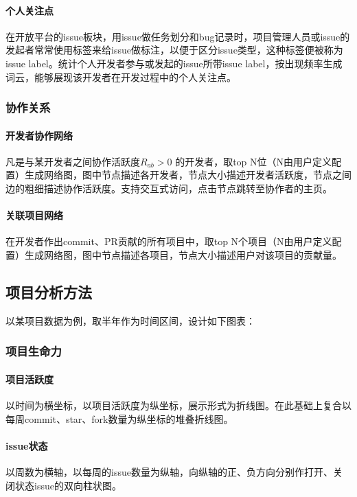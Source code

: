 \paragraph{个人关注点} 在开放平台的issue板块，用issue做任务划分和bug记录时，项目管理人员或issue的发起者常常使用标签来给issue做标注，以便于区分issue类型，这种标签便被称为issue label。统计个人开发者参与或发起的issue所带issue label，按出现频率生成词云，能够展现该开发者在开发过程中的个人关注点。

\subsubsection{协作关系}
\paragraph{开发者协作网络} 凡是与某开发者之间协作活跃度$R_{ab} > 0$ 的开发者，取top N位（N由用户定义配置）生成网络图，图中节点描述各开发者，节点大小描述开发者活跃度，节点之间边的粗细描述协作活跃度。支持交互式访问，点击节点跳转至协作者的主页。

\paragraph{关联项目网络} 在开发者作出commit、PR贡献的所有项目中，取top N个项目（N由用户定义配置）生成网络图，图中节点描述各项目，节点大小描述用户对该项目的贡献量。

\subsection{项目分析方法}
\par 以某项目数据为例，取半年作为时间区间，设计如下图表：
\subsubsection{项目生命力}
\paragraph{项目活跃度} 以时间为横坐标，以项目活跃度为纵坐标，展示形式为折线图。在此基础上复合以每周commit、star、fork数量为纵坐标的堆叠折线图。
\paragraph{issue状态} 以周数为横轴，以每周的issue数量为纵轴，向纵轴的正、负方向分别作打开、关闭状态issue的双向柱状图。
